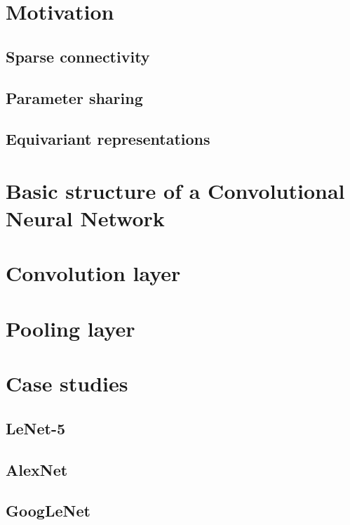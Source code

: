 \section{Motivation}

\subsection{Sparse connectivity}

\subsection{Parameter sharing}

\subsection{Equivariant representations}


\section{Basic structure of a Convolutional Neural Network}

\section{Convolution layer}

\section{Pooling layer}




\section{Case studies}
\subsection{LeNet-5}

\subsection{AlexNet}

\subsection{GoogLeNet}

